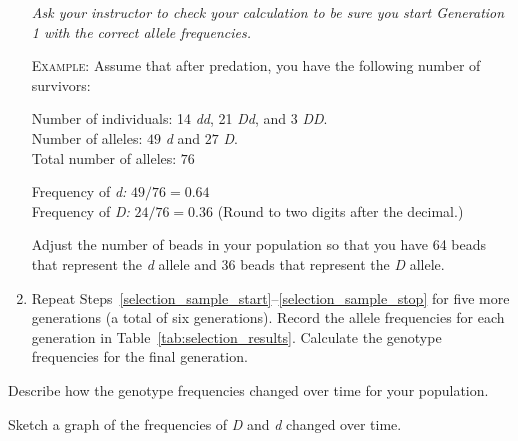 \documentclass[12pt]{exam}
\newcommand{\allele}[1]{\textit{#1}}
\begin{document}
\begin{questions}
\begin{enumerate}
	\textit{Ask your instructor to check your calculation to be sure you start Generation 1 with the correct allele frequencies.}
	
	\textsc{Example:} Assume that after predation, you have the following number of survivors:
	
	Number of individuals: 14 \allele{dd}, 21 \allele{Dd}, and 3 \allele{DD}.\\
	Number of alleles: $49$ \allele{d} and $27$ \allele{D}.\\
	Total number of alleles: $76$

	Frequency of \allele{d:} $49/76 = 0.64$\\
	Frequency of \allele{D:} $24/76 = 0.36$ (Round to two digits after the decimal.)

	Adjust the number of beads in your population so that you have 64 beads that represent the \allele{d} allele and 36 beads that represent the \allele{D} allele.  
	
	\item Repeat Steps~\ref{selection_sample_start}–\ref{selection_sample_stop} for five more generations (a total of six generations). Record the allele frequencies for each generation in Table~\ref{tab:selection_results}. Calculate the genotype frequencies for the final generation. 
	
\end{enumerate}

\question
Describe how the genotype frequencies changed over time for your population.

\newpage

\question
Sketch a graph of the frequencies of \allele{D} and \allele{d} changed over time.





\end{questions}
\end{document}
